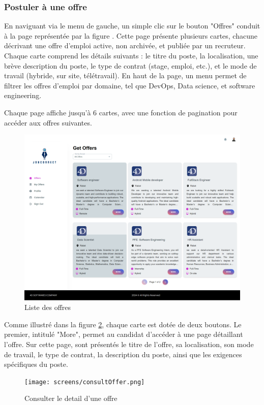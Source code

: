 \vspace{6cm}

\subsubsection{Postuler à une offre}
En naviguant via le menu de gauche, un simple clic sur le 
bouton "Offres" conduit à la page représentée par la figure .  
Cette  page  présente plusieurs cartes, chacune décrivant une  
offre d'emploi active, non  archivée, et  publiée par un 
recruteur. Chaque carte comprend les détails suivants : 
le titre du poste, la localisation, une brève description 
du poste, le  type de  contrat (stage, emploi, etc.), et 
le mode de travail (hybride, sur site, télétravail). En haut 
de la page, un menu permet de filtrer les offres d'emploi par 
domaine, tel que DevOps, Data science, et software engineering.
\newline

Chaque page affiche jusqu'à 6 cartes,  avec  une  fonction  de  pagination pour accéder aux offres suivantes.
\begin{figure}[htbp]
   \centering
   \includegraphics[scale=0.2]{screens/Offfers.png} 
   \caption{Liste des offres}
   \label{fig:listOffers}
\end{figure}

Comme illustré dans la figure \ref{fig:detailsOffre}, chaque 
carte est dotée de deux boutons. Le premier, intitulé "More", 
permet au candidat d'accéder à une page détaillant l'offre. 
Sur cette page, sont présentés  le  titre  de  l'offre,  
sa  localisation,  son mode de travail, le type de contrat, 
la description du  poste,  ainsi  que  les exigences 
spécifiques du poste.
\newline
\begin{figure}[htb]
   \centering
   \texttt{[image: screens/consultOffer.png]} 
   \caption{Consulter le detail d'une offre}
   \label{fig:detailsOffre}
\end{figure}
\vspace{3cm}

